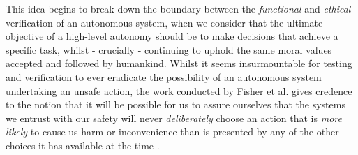\documentclass[conference]{IEEEtran}
\begin{document}
This idea begins to break down the boundary between the \textit{functional} and \textit{ethical} verification of an autonomous system, when we consider that the ultimate objective of a high-level autonomy should be to make decisions that achieve a specific task, whilst - crucially - continuing to uphold the same moral values accepted and followed by humankind. Whilst it seems insurmountable for testing and verification to ever eradicate the possibility of an autonomous system undertaking an unsafe action, the work conducted by Fisher et al. gives credence to the notion that it will be possible for us to assure ourselves that the systems we entrust with our safety will never \textit{deliberately} choose an action that is \textit{more likely} to cause us harm or inconvenience than is presented by any of the other choices it has available at the time \cite{fisher-1}. 






%
%
%
%
%
%







%
%
%
%
%
%
\end{document}
